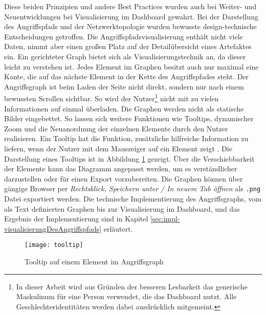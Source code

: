 %
\par Diese beiden Prinzipien und andere Best Practices wurden auch bei Weiter- und Neuentwicklungen bei Visualisierung im Dashboard gewahrt. Bei der Darstellung des Angriffspfads und der Netzwerktopologie wurden bewusste design-technische Entscheidungen getroffen. Die Angriffspfadsvisualisierung enthält nicht viele Daten, nimmt aber einen großen Platz auf der Detailübersicht eines Artefaktes ein. Ein gerichteter Graph bietet sich als Visualisierungstechnik an, da dieser leicht zu verstehen ist. Jedes Element im Graphen besitzt auch nur maximal eine Kante, die auf das nächste Element in der Kette des Angriffspfades steht. Der Angriffsgraph ist beim Laden der Seite nicht direkt, sondern nur nach einem bewussten Scrollen sichtbar. So wird der Nutzer\footnote{In dieser Arbeit wird aus Gründen der besseren Lesbarkeit das generische Maskulinum für eine Person verwendet, die das Dashboard nutzt. Alle Geschlechteridentitäten werden dabei ausdrücklich mitgemeint.} nicht mit zu vielen Informationen auf einmal überladen. Die Graphen werden nicht als statische Bilder eingebettet. So lassen sich weitere Funktionen wie Tooltips, dynamischer Zoom und die Neuanordnung der einzelnen Elemente durch den Nutzer realisieren. Ein Tooltip hat die Funktion, zusätzliche hilfreiche Information zu liefern, wenn der Nutzer mit dem Mauszeiger auf ein Element zeigt \autocite{TooltipCarbonDesign}. Die Darstellung eines Tooltips ist in Abbildung \ref{fig:tooltip} gezeigt. Über die Verschiebbarkeit der Elemente kann das Diagramm angepasst werden, um es verständlicher darzustellen oder für einen Export vorzubereiten. Die Graphen können über gängige Browser per \textit{Rechtsklick, Speichern unter / In neuem Tab öffnen} als \verb|.png| Datei exportiert werden. Die technische Implementierung des Angriffsgraphs, vom als Text definierten Graphen bis zur Visualisierung im Dashboard, und das Ergebnis der Implementierung sind in Kapitel \ref{sec:impl-visualisierungDesAngriffspfads} erläutert.
%
\begin{figure}
    \centering
    \texttt{[image: tooltip]}
    \caption{Tooltip auf einem Element im Angriffsgraph}
    \label{fig:tooltip}
\end{figure}
%
